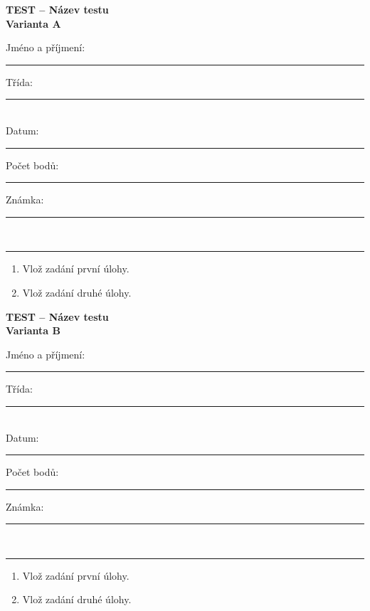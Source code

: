 \documentclass[a4paper,11pt]{article}
\newcommand{\TestTitle}{Název testu}
\newcommand{\TestHeader}[1]{%
    \begin{center}
        {\Large\bfseries TEST -- \TestTitle}\\[2mm]
        {\bfseries Varianta #1}
    \end{center}
    \vspace{2mm}
    Jméno a příjmení: \rule{9cm}{0.4pt}\hfill Třída: \rule{2cm}{0.4pt}\\[3mm]
    Datum: \rule{3cm}{0.4pt}\hfill Počet bodů: \rule{2cm}{0.4pt}\hfill Známka: \rule{2cm}{0.4pt}\\[2mm]
    \hrule\vspace{4mm}
}
\newcommand{\AnswerSpace}[1]{\vspace{#1}}
\begin{document}
\TestHeader{A}

\begin{enumerate}
    \item Vlož zadání první úlohy.
    \AnswerSpace{25mm}
    \item Vlož zadání druhé úlohy.
    \AnswerSpace{25mm}
\end{enumerate}

\newpage
\TestHeader{B}

\begin{enumerate}
    \item Vlož zadání první úlohy.
    \AnswerSpace{25mm}
    \item Vlož zadání druhé úlohy.
    \AnswerSpace{25mm}
\end{enumerate}
\end{document}
